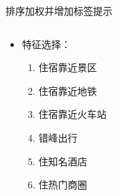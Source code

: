 \documentclass{beamer}
\begin{document}
\begin{CJK}{UTF8}{gbsn}
\begin{frame}{排序加权并增加标签提示}
  \begin{columns}
    \begin{column}{0.4\textwidth}
      \begin{itemize}
      \item <2-> {
        特征选择：
        \begin {enumerate}
        \item { 住宿靠近景区 }
        \item { 住宿靠近地铁 }
        \item { 住宿靠近火车站}
        \item { 错峰出行 }
        \item { 住知名酒店 }
        \item { 住热门商圈 }
        \end {enumerate}
      }
      \end{itemize}
    \end{column}
    \begin{column}{0.6\textwidth}
      \begin{center}

\end{center}
\end{column}
\end{columns}
\end{frame}
\end{CJK}
\end{document}
